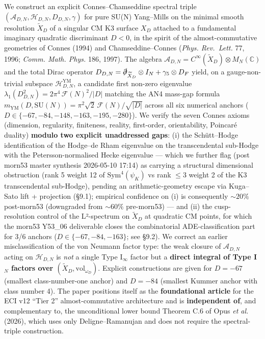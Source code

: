 \documentclass[
  11pt,
  a4paper,
]{amsart}
\begin{document}
We construct an explicit Connes--Chamseddine spectral triple
\((\mathcal{A}_{D,N}, \mathcal{H}_{D,N}, D_{D,N}, \gamma)\) for pure SU(N) Yang--Mills on
the minimal smooth resolution \(\widetilde{X}_D\) of a singular CM K3 surface \(X_D\)
attached to a fundamental imaginary quadratic discriminant \(D < 0\), in the spirit
of the almost-commutative geometries of Connes (1994) and Chamseddine--Connes
(\emph{Phys. Rev.~Lett.} 77, 1996; \emph{Comm. Math. Phys.} 186, 1997). The algebra
\(\mathcal{A}_{D,N} = C^\infty(\widetilde{X}_D) \otimes M_N(\mathbb{C})\) and the
total Dirac operator
\(D_{D,N} = \slashed{\partial}_{\widetilde{X}_D} \otimes I_N + \gamma_5 \otimes D_F\)
yield, on a gauge-non-trivial subspace \(\mathcal{H}_{D,N}^{\mathrm{YM}}\), a
candidate first non-zero eigenvalue
\(\lambda_1(D_{D,N}^2) = 2\pi^4\, \mathcal{F}(N)^2 / |D|\)
matching the AN4 mass-gap formula
\(m_{\mathrm{YM}}(D, \mathrm{SU}(N)) = \pi^2\sqrt{2}\,\mathcal{F}(N) / \sqrt{|D|}\)
across all six numerical anchors (\(D \in \{-67,-84,-148,-163,-195,-280\}\)). We
verify the seven Connes axioms (dimension, regularity, finiteness, reality,
first-order, orientability, Poincaré duality) \textbf{modulo two explicit unaddressed
gaps}: (i) the Schütt--Hodge identification of the Hodge--de Rham eigenvalue on
the transcendental sub-Hodge with the Petersson-normalised Hecke eigenvalue ---
which we further flag (post morn53 master synthesis 2026-05-10 17:14) as
carrying a structural dimensional obstruction (rank 5 weight 12 of
\(\mathrm{Sym}^4(\psi_K)\) vs rank \(\le 3\) weight 2 of the K3 transcendental
sub-Hodge), pending an arithmetic-geometry escape via Kuga--Sato lift +
projection (§9.1); empirical confidence on (i) is consequently \(\sim 20\%\)
post-morn53 (downgraded from \(\sim 60\%\) pre-morn53) --- and
(ii) the cusp-resolution control of the L²-spectrum on \(\widetilde{X}_D\) at
quadratic CM points, for which the morn53 Y53\_06 deliverable closes the
combinatorial ADE-classification part for 3/6 anchors (\(D \in \{-67, -84, -163\}\);
see §9.2). We correct an earlier misclassification of the von Neumann
factor type: the weak closure of \(\mathcal{A}_{D,N}\) acting on \(\mathcal{H}_{D,N}\)
is \emph{not} a single Type I\(_\infty\) factor but a \textbf{direct integral of Type I\(_N\)
factors over \((\widetilde{X}_D, \mathrm{vol}_{\omega_D})\)}. Explicit constructions
are given for \(D = -67\) (smallest class-number-one anchor) and \(D = -84\)
(smallest Kummer anchor with class number 4). The paper positions itself as the
\textbf{foundational article} for the ECI v12 ``Tier 2'' almost-commutative architecture
and is \textbf{independent of}, and complementary to, the unconditional lower bound
Theorem C.6 of Opus \emph{et al.} (2026), which uses only Deligne--Ramanujan and does
not require the spectral-triple construction.
\end{document}
